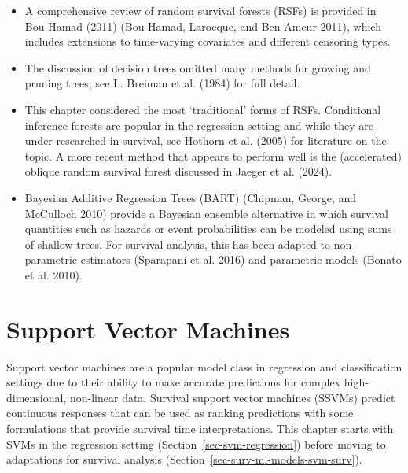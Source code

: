 \documentclass[
  letterpaper,
  krantz2]{style/krantz}
\providecommand{\tightlist}{%
  \setlength{\itemsep}{0pt}\setlength{\parskip}{0pt}}
\begin{document}
\begin{tcolorbox}[enhanced jigsaw, toprule=.15mm, bottomtitle=1mm, opacityback=0, breakable, leftrule=.75mm, title={Further reading}, toptitle=1mm, bottomrule=.15mm, colback=white, colframe=quarto-callout-tip-color-frame, titlerule=0mm, opacitybacktitle=0.6, coltitle=black, rightrule=.15mm, left=2mm, colbacktitle=quarto-callout-tip-color!10!white, arc=.35mm]

\begin{itemize}
\tightlist
\item
  A comprehensive review of random survival forests (RSFs) is provided
  in Bou-Hamad (2011) (Bou-Hamad, Larocque, and Ben-Ameur 2011), which
  includes extensions to time-varying covariates and different censoring
  types.
\item
  The discussion of decision trees omitted many methods for growing and
  pruning trees, see L. Breiman et al. (1984) for full detail.
\item
  This chapter considered the most `traditional' forms of RSFs.
  Conditional inference forests are popular in the regression setting
  and while they are under-researched in survival, see Hothorn et al.
  (2005) for literature on the topic. A more recent method that appears
  to perform well is the (accelerated) oblique random survival forest
  discussed in Jaeger et al. (2024).
\item
  Bayesian Additive Regression Trees (BART) (Chipman, George, and
  McCulloch 2010) provide a Bayesian ensemble alternative in which
  survival quantities such as hazards or event probabilities can be
  modeled using sums of shallow trees. For survival analysis, this has
  been adapted to non-parametric estimators (Sparapani et al. 2016) and
  parametric models (Bonato et al. 2010).
\end{itemize}

\end{tcolorbox}

\chapter{Support Vector Machines}\label{sec-svm}

Support vector machines are a popular
model class in regression and classification settings due to their
ability to make accurate predictions for complex high-dimensional,
non-linear data. Survival support vector
machines (SSVMs) predict
continuous responses that can be used as ranking predictions with some
formulations that provide survival time interpretations. This chapter
starts with SVMs in the regression setting
(Section~\ref{sec-svm-regression}) before moving to adaptations for
survival analysis (Section~\ref{sec-surv-ml-models-svm-surv}).
\end{document}
